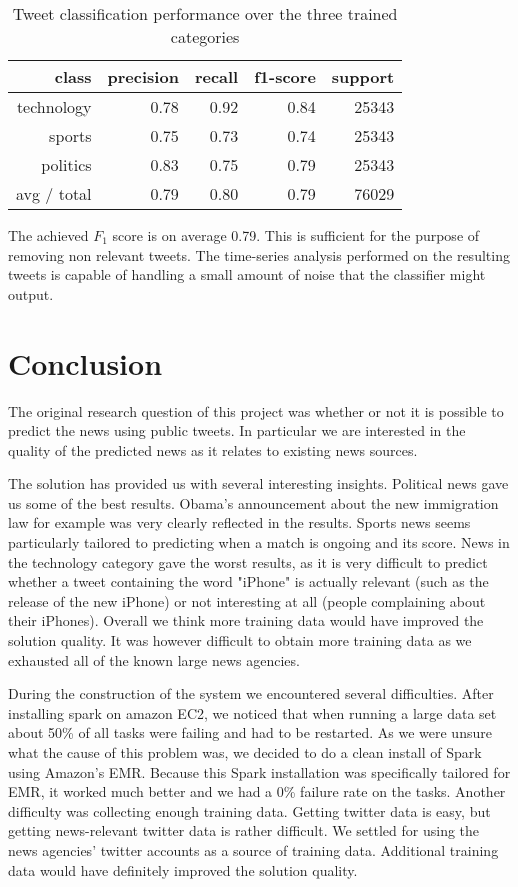 \documentclass{llncs}
\begin{document}
\begin{table}[H]
	\begin{center}
		\begin{tabular}{|r|r|r|r|r|} \hline
			class  & precision   & recall & f1-score  & support \\ \hline
			technology    &   0.78 &     0.92  &    0.84   &  25343 \\
			sports   &    0.75   &   0.73   &   0.74   &   25343 \\
			politics   &    0.83  &    0.75   &   0.79   &   25343 \\
			avg / total  &     0.79   &   0.80  &    0.79   &  76029 \\ \hline
		\end{tabular}
	\end{center}
	\caption{Tweet classification performance over the three trained categories}
	\label{tbl:newclassifier}
\end{table}

The achieved $F_1$ score is on average 0.79. This is sufficient for the purpose of removing non relevant tweets. The time-series analysis performed on the resulting tweets is capable of handling a small amount of noise that the classifier might output.

\section{Conclusion}
The original research question of this project was whether or not it is possible to predict the news using public tweets. In particular we are interested in the quality of the predicted news as it relates to existing news sources.

The solution has provided us with several interesting insights. Political news gave us some of the best results. Obama's announcement about the new immigration law for example was very clearly reflected in the results. Sports news seems particularly tailored to predicting when a match is ongoing and its score. News in the technology category gave the worst results, as it is very difficult to predict whether a tweet containing the word "iPhone" is actually relevant (such as the release of the new iPhone) or not interesting at all (people complaining about their iPhones). Overall we think more training data would have improved the solution quality. It was however difficult to obtain more training data as we exhausted all of the known large news agencies.

During the construction of the system we encountered several difficulties. After installing spark on amazon EC2, we noticed that when running a large data set about 50\% of all tasks were failing and had to be restarted. As we were unsure what the cause of this problem was, we decided to do a clean install of Spark using Amazon's EMR. Because this Spark installation was specifically tailored for EMR, it worked much better and we had a 0\% failure rate on the tasks. Another difficulty was collecting enough training data. Getting twitter data is easy, but getting news-relevant twitter data is rather difficult. We settled for using the news agencies' twitter accounts as a source of training data. Additional training data would have definitely improved the solution quality.
\end{document}
